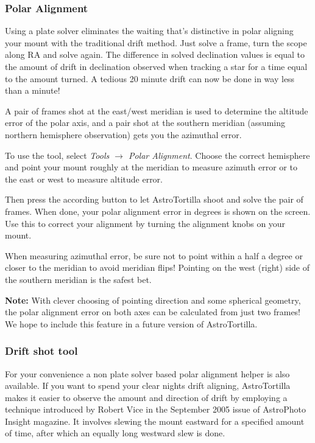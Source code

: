 \documentclass[english]{article}
\begin{document}
\subsubsection{Polar Alignment}

Using a plate solver eliminates the waiting that's distinctive in polar aligning 
your mount with the traditional drift method. Just solve a frame, turn the scope 
along RA and solve again. The difference in solved declination values is equal 
to the amount of drift in declination observed when tracking a star for a time 
equal to the amount turned. A tedious 20 minute drift can now be done in way less than a minute!

A pair of frames shot at the east/west meridian is used to determine the
altitude error of the polar axis, and a pair shot at the southern meridian
(assuming northern hemisphere observation) gets you the azimuthal error.

To use the tool, select \emph{Tools $\rightarrow$ Polar Alignment}. Choose the
correct hemisphere and point your mount roughly at the meridian to measure
azimuth error or to the east or west to measure altitude error.

Then press the according button to let AstroTortilla shoot and solve the pair
of frames. When done, your polar alignment error in degrees is shown on the
screen. Use this to correct your alignment by turning the alignment knobs on
your mount.

When measuring azimuthal error, be sure not to point within a half a degree or
closer to the meridian to avoid meridian flips! Pointing on the west (right)
side of the southern meridian is the safest bet.

{\footnotesize \textbf{Note:} With clever choosing of pointing direction and some
spherical geometry, the polar alignment error on both axes can be calculated from 
just two frames! We hope to include this feature in a future version of AstroTortilla.}

\subsubsection{Drift shot tool}

For your convenience a non plate solver based polar alignment helper is also available.
If you want to spend your clear nights drift aligning, AstroTortilla makes it 
easier to observe the amount and direction of drift by
employing a technique introduced by Robert Vice in the September 2005 issue of
AstroPhoto Insight magazine. It involves slewing the mount eastward for a
specified amount of time, after which an equally long westward slew is done.
\end{document}
